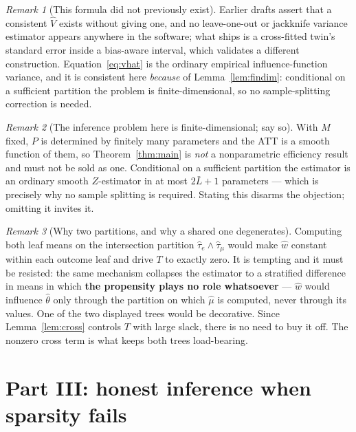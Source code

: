 \documentclass[11pt]{article}
\theoremstyle{plain}
\theoremstyle{definition}
\theoremstyle{remark}
\newtheorem{remark}{Remark}
\newcommand{\mhat}{\widehat{\mu}}
\newcommand{\what}{\widehat{w}}
\newcommand{\that}{\widehat{\tau}}
\newcommand{\thetahat}{\widehat{\theta}}
\newcommand{\Vhat}{\widehat{V}}
\begin{document}
\begin{remark}[This formula did not previously exist]
Earlier drafts assert that a consistent $\Vhat$ exists without giving one, and no
leave-one-out or jackknife variance estimator appears anywhere in the software;
what ships is a cross-fitted twin's standard error inside a bias-aware interval,
which validates a different construction. Equation~\eqref{eq:vhat} is the
ordinary empirical influence-function variance, and it is consistent here
\emph{because} of Lemma~\ref{lem:findim}: conditional on a sufficient partition
the problem is finite-dimensional, so no sample-splitting correction is needed.
\end{remark}

\begin{remark}[The inference problem here is finite-dimensional; say so]
\label{rem:findim-objection}
With $M$ fixed, $P$ is determined by finitely many parameters and the ATT is a
smooth function of them, so Theorem~\ref{thm:main} is \emph{not} a nonparametric
efficiency result and must not be sold as one. Conditional on a sufficient
partition the estimator is an ordinary smooth $Z$-estimator in at most
$2\bar L+1$ parameters --- which is precisely why no sample splitting is
required. Stating this disarms the objection; omitting it invites it.
\end{remark}

\begin{remark}[Why two partitions, and why a shared one degenerates]
\label{rem:shared}
Computing both leaf means on the intersection partition
$\that_e\wedge\that_\mu$ would make $\what$ constant within each outcome leaf and
drive $T$ to exactly zero. It is tempting and it must be resisted: the same
mechanism collapses the estimator to a stratified difference in means in which
\textbf{the propensity plays no role whatsoever} --- $\what$ would influence
$\thetahat$ only through the partition on which $\mhat$ is computed, never
through its values. One of the two displayed trees would be decorative. Since
Lemma~\ref{lem:cross} controls $T$ with large slack, there is no need to buy it
off. The nonzero cross term is what keeps both trees load-bearing.
\end{remark}

\section{Part III: honest inference when sparsity fails}
\end{document}

